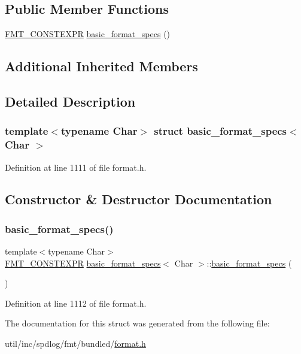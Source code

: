 \subsection*{Public Member Functions}
\begin{DoxyCompactItemize}
\item 
\hyperlink{core_8h_a69201cb276383873487bf68b4ef8b4cd}{F\+M\+T\+\_\+\+C\+O\+N\+S\+T\+E\+X\+PR} \hyperlink{structbasic__format__specs_a90f18b8773c1dd374463fdda63fa2a2c}{basic\+\_\+format\+\_\+specs} ()
\end{DoxyCompactItemize}
\subsection*{Additional Inherited Members}


\subsection{Detailed Description}
\subsubsection*{template$<$typename Char$>$\newline
struct basic\+\_\+format\+\_\+specs$<$ Char $>$}



Definition at line 1111 of file format.\+h.



\subsection{Constructor \& Destructor Documentation}
\mbox{\label{structbasic__format__specs_a90f18b8773c1dd374463fdda63fa2a2c}} 
\subsubsection{\texorpdfstring{basic\+\_\+format\+\_\+specs()}{basic\_format\_specs()}}
{\footnotesize\ttfamily template$<$typename Char$>$ \\
\hyperlink{core_8h_a69201cb276383873487bf68b4ef8b4cd}{F\+M\+T\+\_\+\+C\+O\+N\+S\+T\+E\+X\+PR} \hyperlink{structbasic__format__specs}{basic\+\_\+format\+\_\+specs}$<$ Char $>$\+::\hyperlink{structbasic__format__specs}{basic\+\_\+format\+\_\+specs} (\begin{DoxyParamCaption}{ }\end{DoxyParamCaption})\hspace{0.3cm}{\ttfamily [inline]}}



Definition at line 1112 of file format.\+h.



The documentation for this struct was generated from the following file\+:\begin{DoxyCompactItemize}
\item 
util/inc/spdlog/fmt/bundled/\hyperlink{format_8h}{format.\+h}\end{DoxyCompactItemize}
